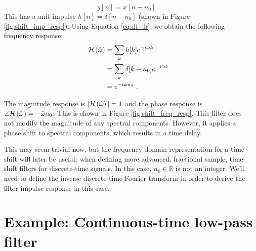 \begin{equation}
    y[n] = x[n-n_0] \,\,.
\end{equation}
This has a unit impulse $h[n]=\delta[n-n_0]$ (shown in
Figure \ref{fig:shift_imp_resp}). Using Equation \ref{eq:dt_fr}, we
obtain the following frequency response:
\begin{align}
    \mathcal{H}\left(\hat{\omega}\right) & = \sum_k h[k] e^{-i\hat{\omega}k}          \\
        & = \sum_k \delta[k-n_0] e^{-i\hat{\omega}k} \\
        & = e^{-i\hat{\omega}n_0} \,\,.
\end{align}

The magnitude response is $|\mathcal{H}\left(\hat{\omega}\right)|=1$ and the phase response is
$\angle \mathcal{H}\left(\hat{\omega}\right) = -\hat{\omega}n_0$. This is shown in
Figure \ref{fig:shift_freq_resp}. This filter does not modify the
magnitude of any spectral components. However, it applies a phase
shift to spectral components, which results in a time delay.


This may seem trivial now, but the frequency domain representation for
a time-shift will later be useful; when defining more advanced,
fractional sample, time-shift filters for discrete-time signals. In
this case, $n_0 \in \mathbb{R}$ is not an integer. We'll need to
define the inverse discrete-time Fourier transform in order to derive
the filter impulse response in this case.


\section{Example: Continuous-time low-pass filter}


